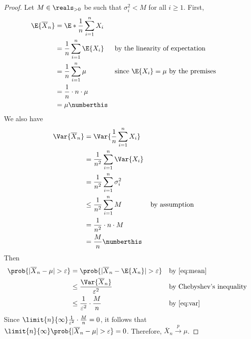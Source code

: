 \documentclass[%
  hwnumber=7,%
  studentnumber=20053722,%
  {name=Bryan Hoang}%
]{%
  mthe353answer%
}
\begin{document}
  \begin{questions}
    \setcounter{question}{4}
    \question{}
    \begin{solution}
      \begin{proof}
        Let \(M \in \reals_{>0}\) be such that \(\sigma_i^2 < M\) for all \(i \ge 1\).
        First,
        \begin{align*}
          \E{\overline{X}_n} &= \E*{\frac{1}{n}\sum_{i=1}^n X_i}\\
          &= \frac{1}{n} \sum_{i=1}^n \E{X_i} && \text{by the linearity of expectation}\\
          &= \frac{1}{n} \sum_{i=1}^n \mu && \text{since \(\E{X_i} = \mu\) by the premises}\\
          &= \frac{1}{n} \cdot n \cdot \mu\\
          &= \mu \numberthis\label{eq:mean}
        \end{align*}
        We also have
        \begin{align*}
          \Var{\overline{X}_n} &= \Var{\frac{1}{n} \sum_{i=1}^n X_i}\\
          &= \frac{1}{n^2} \sum_{i=1}^n \Var{X_i}\\
          &= \frac{1}{n^2} \sum_{i=1}^n \sigma_i^2\\
          &\le \frac{1}{n^2} \sum_{i=1}^n M && \text{by assumption}\\
          &= \frac{1}{n^2} \cdot n \cdot M\\
          &= \frac{M}{n} \numberthis\label{eq:var}
        \end{align*}
        Then
        \begin{align*}
          \prob{|\overline{X}_n - \mu| > \varepsilon} &=
            \prob{|\overline{X}_n - \E{X_n}| > \varepsilon}
            && \text{by~\eqref{eq:mean}}\\
          &\le \frac{\Var{\overline{X}_n}}{\varepsilon^2} && \text{by Chebyshev’s inequality}\\
          &\le \frac{1}{\varepsilon^2} \cdot \frac{M}{n}
            && \text{by~\eqref{eq:var}}
        \end{align*}
        Since \(\limit{n}{\infty} \frac{1}{\varepsilon^2} \cdot \frac{M}{n} = 0\),
        it follows that \(\limit{n}{\infty} \prob{|\overline{X}_n - \mu| > \varepsilon} = 0\).
        Therefore, \(\overline{X}_n \xrightarrow{p} \mu\).
      \end{proof}
    \end{solution}
  \end{questions}
\end{document}

